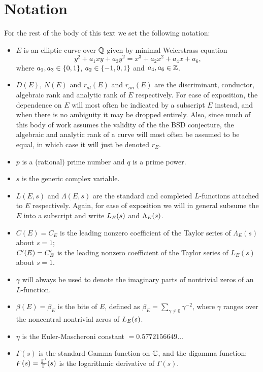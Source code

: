 
\section{Notation}\label{subsec:notation}

For the rest of the body of this text we set the following notation:
\begin{itemize}
\item $E$ is an elliptic curve over $\mathbb{Q}$ given by minimal Weierstrass equation
\begin{equation*}
y^2 + a_1 xy + a_3 y^2 = x^3 + a_2 x^2 + a_4 x + a_6,
\end{equation*}
 where $a_1, a_3 \in \left\{0,1\right\}$, $a_2 \in \left\{-1,0,1\right\}$ and $a_4,a_6 \in \mathbb{Z}$.
\item $D(E)$, $N(E)$ and $r_{al}(E)$  and $r_{an}(E)$ are the discriminant, conductor, algebraic rank and analytic rank of $E$ respectively. For ease of exposition, the dependence on $E$ will most often be indicated by a subscript $E$ instead, and when there is no ambiguity it may be dropped entirely. Also, since much of this body of work assumes the validity of the the BSD conjecture, the algebraic and analytic rank of a curve will most often be assumed to be equal, in which case it will just be denoted $r_E$.
\item $p$ is a (rational) prime number and $q$ is a prime power.
\item $s$ is the generic complex variable.
\item $L(E,s)$ and $\Lambda(E,s)$ are the standard and completed $L$-functions attached to $E$ respectively. Again, for ease of exposition we will in general subsume the $E$ into a subscript and write $L_E(s)$ and $\Lambda_E(s)$.
\item $C(E) = C_E$ is the leading nonzero coefficient of the Taylor series of $\Lambda_E(s)$ about $s=1$; \\
$C^{\prime}(E) = C^{\prime}_E$ is the leading nonzero coefficient of the Taylor series of $L_E(s)$ about $s=1$.
\item $\gamma$ will always be used to denote the imaginary parts of nontrivial zeros of an $L$-function.
\item $\beta(E) = \beta_E$ is the bite of $E$, defined as $\beta_E = \sum_{\gamma\ne 0} \gamma^{-2}$, where $\gamma$ ranges over the noncentral nontrivial zeros of $L_E(s)$.
\item $\eta$ is the Euler-Mascheroni constant $= 0.5772156649\ldots$
\item $\Gamma(s)$ is the standard Gamma function on $\mathbb{C}$, and the digamma function: $\digamma(s) = \frac{\Gamma^{\prime}}{\Gamma}(s)$ is the logarithmic derivative of $\Gamma(s)$.
\end{itemize}


